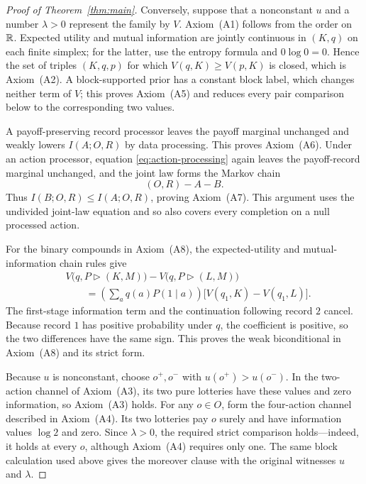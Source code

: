 \begin{proof}[Proof of Theorem~\ref{thm:main}]
Conversely, suppose that a nonconstant $u$ and a number $\lambda>0$ represent
the family by $V$.  Axiom~\textup{(A1)} follows from the order on $\mathbb R$.
Expected utility and mutual information are jointly continuous in $(K,q)$ on
each finite simplex; for the latter, use the entropy formula and $0\log0=0$.
Hence the set of triples $(K,q,p)$ for which $V(q,K)\ge V(p,K)$ is closed,
which is Axiom~\textup{(A2)}.  A block-supported prior has a constant block
label, which changes neither term of $V$; this proves Axiom~\textup{(A5)} and
reduces every pair comparison below to the corresponding two values.

A payoff-preserving record processor leaves the payoff marginal unchanged and
weakly lowers $I(A;O,R)$ by data processing.  This proves
Axiom~\textup{(A6)}.  Under an action processor, equation
\eqref{eq:action-processing} again leaves the payoff-record marginal unchanged,
and the joint law forms the Markov chain
\[
(O,R)-A-B.
\]
Thus $I(B;O,R)\le I(A;O,R)$, proving Axiom~\textup{(A7)}.  This argument uses
the undivided joint-law equation and so also covers every completion on a null
processed action.

For the binary compounds in Axiom~\textup{(A8)}, the expected-utility and mutual-information chain rules give
\begin{align*}
&V\bigl(q,P\triangleright(K,M)\bigr)-V\bigl(q,P\triangleright(L,M)\bigr)\\
&\qquad =\left(\sum_a q(a)P(1\mid a)\right)
 \bigl[V(q_1,K)-V(q_1,L)\bigr].
\end{align*}
The first-stage information term and the continuation following record $2$ cancel.  Because record $1$ has
positive probability under $q$, the coefficient is positive, so the two differences have the same sign.  This
proves the weak biconditional in Axiom~\textup{(A8)} and its strict form.

Because $u$ is nonconstant, choose $o^+,o^-$ with $u(o^+)>u(o^-)$.  In the
two-action channel of Axiom~\textup{(A3)}, its two pure lotteries have these
values and zero information, so Axiom~\textup{(A3)} holds.  For any $o\in O$,
form the four-action channel described in Axiom~\textup{(A4)}.  Its two
lotteries pay $o$ surely and have information values $\log2$ and zero.  Since
$\lambda>0$, the required strict comparison holds---indeed, it holds at every
$o$, although Axiom~\textup{(A4)} requires only one.  The same block calculation used above gives the moreover
clause with the original witnesses $u$ and $\lambda$.
\end{proof}
